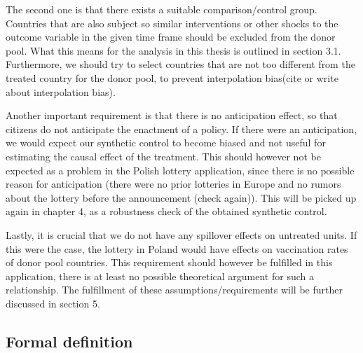 \documentclass{scrbook}
\begin{document}
The second one is that there exists a suitable comparison/control group.
Countries that are also subject so similar interventions or other shocks
to the outcome variable in the given time frame should be excluded from
the donor pool. What this means for the analysis in this thesis is
outlined in section 3.1. Furthermore, we should try to select countries
that are not too different from the treated country for the donor pool,
to prevent interpolation bias(cite or write about interpolation bias).

Another important requirement is that there is no anticipation effect,
so that citizens do not anticipate the enactment of a policy. If there
were an anticipation, we would expect our synthetic control to become
biased and not useful for estimating the causal effect of the treatment.
This should however not be expected as a problem in the Polish lottery
application, since there is no possible reason for anticipation (there
were no prior lotteries in Europe and no rumors about the lottery before
the announcement (check again)). This will be picked up again in chapter
4, as a robustness check of the obtained synthetic control.

Lastly, it is crucial that we do not have any spillover effects on
untreated units. If this were the case, the lottery in Poland would have
effects on vaccination rates of donor pool countries. This requirement
should however be fulfilled in this application, there is at least no
possible theoretical argument for such a relationship. The fulfillment
of these assumptions/requirements will be further discussed in section
5.

\subsection*{Formal definition}
\end{document}
